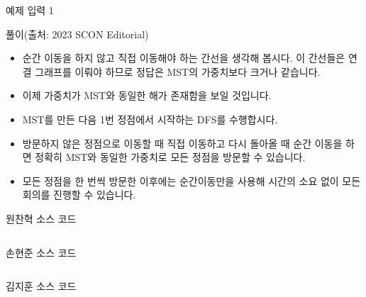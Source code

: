 \begin{frame}{예제 입력 1}
\begin{center}
\end{center}
\end{frame}

\begin{frame}{풀이(출처: 2023 SCON Editorial)}
\begin{itemize}
    \item 순간 이동을 하지 않고 직접 이동해야 하는 간선을 생각해 봅시다. 이 간선들은 연결 그래프를 이뤄야 하므로 정답은 MST의 가중치보다 크거나 같습니다.
    \item 이제 가중치가 MST와 동일한 해가 존재함을 보일 것입니다.
    \item MST를 만든 다음 1번 정점에서 시작하는 DFS를 수행합시다.
    \item 방문하지 않은 정점으로 이동할 때 직접 이동하고 다시 돌아올 때 순간 이동을 하면 정확히 MST와 동일한 가중치로 모든 정점을 방문할 수 있습니다.
    \item 모든 정점을 한 번씩 방문한 이후에는 순간이동만을 사용해 시간의 소요 없이 모든 회의를 진행할 수 있습니다.
\end{itemize}
\end{frame}

\begin{frame}{원찬혁 소스 코드}
\inputminted{java}{../src/\prob/Chanhyeok/Main.java}
\end{frame}

\begin{frame}{손현준 소스 코드}
\inputminted{java}{../src/\prob/hyunjun/P24116.java}
\end{frame}

\begin{frame}{김지훈 소스 코드}
\inputminted{java}{../src/\prob/Jihoon/BOJ_28119.java}
\end{frame}

